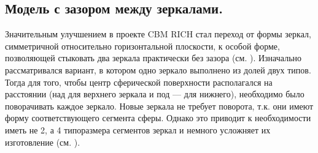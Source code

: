 \subsection{Модель с зазором между зеркалами.}\label{sec:secMirrorsEvolution}

Значительным улучшением в проекте CBM RICH стал переход от формы зеркал, симметричной относительно горизонтальной плоскости, к особой форме, позволяющей стыковать два зеркала практически без зазора (см. ). Изначально рассматривался вариант, в котором одно зеркало выполнено из долей двух типов. Тогда для того, чтобы центр сферической поверхности располагался на расстоянии (над для верхнего зеркала и под --- для нижнего), необходимо было поворачивать каждое зеркало. Новые зеркала не требует поворота, т.к. они имеют форму соответствующего сегмента сферы. Однако это приводит к необходимости иметь не 2, а 4 типоразмера сегментов зеркал и немного усложняет их изготовление (см. ).

